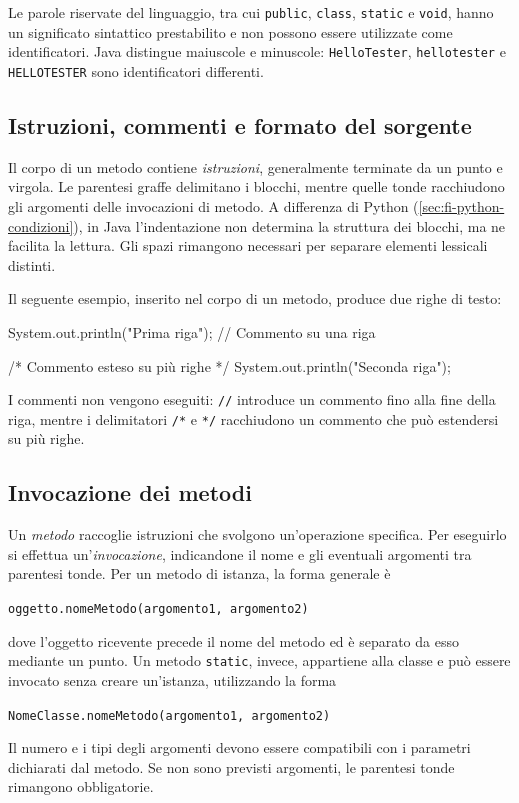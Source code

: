 Le parole riservate del linguaggio, tra cui \texttt{public},
\texttt{class}, \texttt{static} e \texttt{void}, hanno un
significato sintattico prestabilito e non possono essere utilizzate
come identificatori. Java distingue maiuscole e minuscole:
\texttt{HelloTester}, \texttt{hellotester} e
\texttt{HELLOTESTER} sono identificatori differenti.

\subsection{Istruzioni, commenti e formato del sorgente}
\label{sec:fi-java-sintassi}

Il corpo di un metodo contiene \emph{istruzioni}, generalmente
terminate da un punto e virgola. Le parentesi graffe delimitano
i blocchi, mentre quelle tonde racchiudono gli argomenti delle
invocazioni di metodo. A differenza di Python
(\cref{sec:fi-python-condizioni}), in Java l'indentazione
non determina la struttura dei blocchi, ma ne facilita la lettura.
Gli spazi rimangono necessari per separare elementi lessicali
distinti.

\begin{example}
Il seguente esempio, inserito nel corpo di un metodo, produce
due righe di testo:
\begin{unipdcode}[language=Java]
System.out.println("Prima riga"); // Commento su una riga

/* Commento esteso
   su più righe */
System.out.println("Seconda riga");
\end{unipdcode}
I commenti non vengono eseguiti: \texttt{//} introduce un
commento fino alla fine della riga, mentre i delimitatori
\lstinline|/*| e \lstinline|*/| racchiudono un commento
che può estendersi su più righe.
\end{example}

\clearpage

\subsection{Invocazione dei metodi}
\label{sec:fi-java-invocazione-metodi}

Un \emph{metodo} raccoglie istruzioni che svolgono un'operazione
specifica. Per eseguirlo si effettua un'\emph{invocazione},
indicandone il nome e gli eventuali argomenti tra parentesi tonde.
Per un metodo di istanza, la forma generale è
\begin{center}
  \texttt{oggetto.nomeMetodo(argomento1, argomento2)}
\end{center}
dove l'oggetto ricevente precede il nome del metodo ed è separato
da esso mediante un punto. Un metodo \texttt{static}, invece,
appartiene alla classe e può essere invocato senza creare
un'istanza, utilizzando la forma
\begin{center}
  \texttt{NomeClasse.nomeMetodo(argomento1, argomento2)}
\end{center}
Il numero e i tipi degli argomenti devono essere compatibili
con i parametri dichiarati dal metodo. Se non sono previsti
argomenti, le parentesi tonde rimangono obbligatorie.


